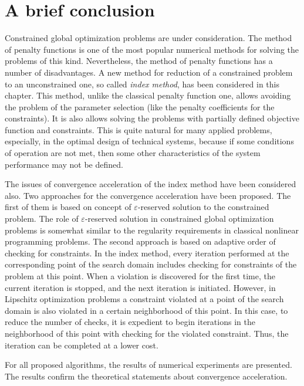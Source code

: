 \documentclass[graybox]{svmult}
\begin{document}
\section*{A brief conclusion}
Constrained global optimization problems are under consideration. The method of penalty functions is one of the most popular numerical methods for solving the problems of this kind. Nevertheless, the method of penalty functions has a number of disadvantages. A new method for reduction of a constrained problem to an unconstrained one, so called \emph{index method}, has been considered in this chapter. This method, unlike the classical penalty function one, allows avoiding the problem of the parameter selection (like the penalty coefficients for the constraints). It is also allows solving the problems with partially defined objective function and constraints. This is quite natural for many applied problems, especially, in the optimal design of technical systems, because if some conditions of operation are not met, then some other characteristics of the system performance may not be defined.

The issues of convergence acceleration of the index method have been considered also. Two approaches for the convergence acceleration have been proposed. The first of them is based on concept of $\varepsilon$-reserved solution to the constrained problem. The role of $\varepsilon$-reserved solution in constrained global optimization problems is somewhat similar to the regularity requirements in classical nonlinear programming problems. The second approach is based on adaptive order of checking for constraints. In the index method, every iteration performed at the corresponding point of the search domain includes checking for constraints of the problem at this point. When a violation is discovered for the first time, the current iteration is stopped, and the next iteration is initiated. However, in Lipschitz optimization problems a constraint violated at a point of the search domain is also violated in a certain neighborhood of this point. In this case, to reduce the number of checks, it is expedient to begin iterations in the neighborhood of this point with checking for the violated constraint. Thus, the iteration can be completed at a lower cost.

For all proposed algorithms, the results of numerical experiments are presented. The results confirm the theoretical statements about convergence acceleration.
\end{document}

